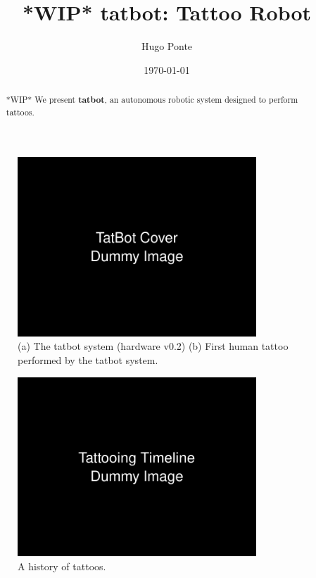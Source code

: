 \documentclass[11pt]{article}
\title{ *WIP* tatbot: Tattoo Robot}
\author{Hugo Ponte}
\date{\today}
\begin{document}
\maketitle

\begin{figure}[h]
    \centering
    \includegraphics[width=0.8\textwidth]{figures/cover.png}
    \caption{(a) The tatbot system (hardware v0.2) (b) First human tattoo performed by the tatbot system. }
    \label{fig:cover}
\end{figure}


\begin{abstract}
*WIP* We present \textbf{tatbot}, an autonomous robotic system designed to perform tattoos.
\end{abstract}

\pagebreak

\begin{figure}[h]
    \centering
    \includegraphics[width=0.8\textwidth]{figures/timeline.png}
    \caption{A history of tattoos.}
    \label{fig:timeline}
\end{figure}
\end{document}
